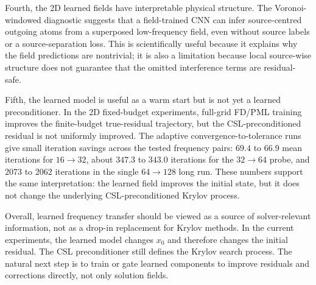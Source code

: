 Fourth, the 2D learned fields have interpretable physical structure. The
Voronoi-windowed diagnostic suggests that a field-trained CNN can infer
source-centred outgoing atoms from a superposed low-frequency field, even
without source labels or a source-separation loss. This is scientifically
useful because it explains why the field predictions are nontrivial; it is
also a limitation because local source-wise structure does not guarantee that
the omitted interference terms are residual-safe.

Fifth, the learned model is useful as a warm start but is not yet a learned
preconditioner. In the 2D fixed-budget experiments, full-grid FD/PML training
improves the finite-budget true-residual trajectory, but the
CSL-preconditioned residual is not uniformly improved. The adaptive
convergence-to-tolerance runs give small iteration savings across the tested
frequency pairs: $69.4$ to $66.9$ mean iterations for $16\to32$, about
$347.3$ to $343.0$ iterations for the $32\to64$ probe, and $2073$ to $2062$
iterations in the single $64\to128$ long run. These numbers support the same
interpretation: the learned field improves the initial state, but it does not
change the underlying CSL-preconditioned Krylov process.

Overall, learned frequency transfer should be viewed as a source of
solver-relevant information, not as a drop-in replacement for Krylov methods.
In the current experiments, the learned model changes $x_0$ and therefore
changes the initial residual. The CSL preconditioner still defines the Krylov
search process. The natural next step is to train or gate learned components
to improve residuals and corrections directly, not only solution fields.
